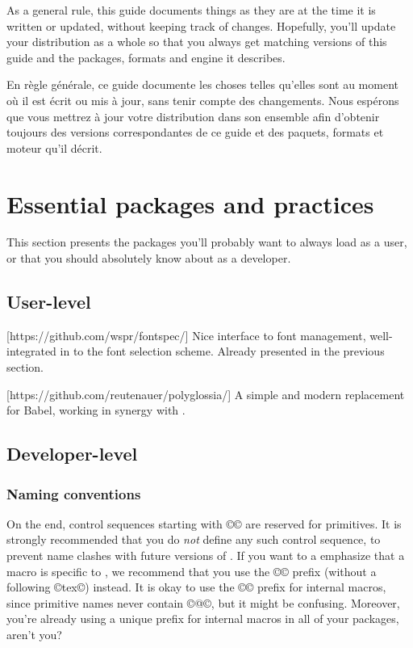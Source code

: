 \documentclass{lltxdoc}
\begin{document}
As a general rule, this guide documents things as they are at the time it is
written or updated, without keeping track of changes. Hopefully, you'll update
your distribution as a whole so that you always get matching versions of this
guide and the packages, formats and engine it describes.

En règle générale, ce guide documente les choses telles qu'elles sont au moment où il est écrit ou mis à jour, sans tenir compte des changements. Nous espérons que vous mettrez à jour votre distribution dans son ensemble afin d'obtenir toujours des versions correspondantes de ce guide et des paquets, formats et moteur qu'il décrit.


\section{Essential packages and practices}\label{essential}

This section presents the packages you'll probably want to always load as a
user, or that you should absolutely know about as a developer.

\subsection{User-level}

[https://github.com/wspr/fontspec/]
Nice interface to font management, well-integrated in to the \latex font
selection scheme. Already presented in the previous section.

[https://github.com/reutenauer/polyglossia/]
A simple and modern replacement for Babel, working in synergy with .

\subsection{Developer-level}

\subsubsection{Naming conventions}

On the \tex end, control sequences starting with ©\luatex© are reserved for
primitives. It is strongly recommended that you do \emph{not} define any such
control sequence, to prevent name clashes with future versions of \luatex. If
you want to a emphasize that a macro is specific to \luatex, we recommend that
you use the ©\lua© prefix (without a following ©tex©) instead. It is okay to
use the ©\luatex@© prefix for internal macros, since primitive names never
contain ©@©, but it might be confusing. Moreover, you're already using a
unique prefix for internal macros in all of your packages, aren't you?
\end{document}
